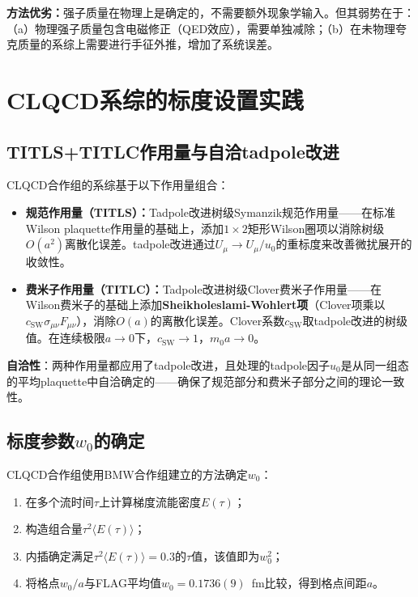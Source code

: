 \documentclass[12pt,a4paper]{ctexart}
\theoremstyle{definition}
\begin{document}
\textbf{方法优劣：}强子质量在物理上是确定的，不需要额外现象学输入。但其弱势在于：（a）物理强子质量包含电磁修正（QED效应），需要单独减除；（b）在未物理夸克质量的系综上需要进行手征外推，增加了系统误差。

\section{CLQCD系综的标度设置实践}

\subsection{TITLS+TITLC作用量与自洽tadpole改进}

CLQCD合作组的系综\cite{CLQCD2025quark_mass,CLQCD2024charm}基于以下作用量组合：

\begin{itemize}
    \item \textbf{规范作用量（TITLS）：}Tadpole改进树级Symanzik规范作用量——在标准Wilson plaquette作用量的基础上，添加$1\times2$矩形Wilson圈项以消除树级$O(a^2)$离散化误差。tadpole改进通过$U_\mu \to U_\mu/u_0$的重标度来改善微扰展开的收敛性。
    \item \textbf{费米子作用量（TITLC）：}Tadpole改进树级Clover费米子作用量——在Wilson费米子的基础上添加\textbf{Sheikholeslami-Wohlert项}（Clover项乘以$c_{\text{SW}} \sigma_{\mu\nu}F_{\mu\nu}$），消除$O(a)$的离散化误差。Clover系数$c_{\text{SW}}$取tadpole改进的树级值。在连续极限$a \to 0$下，$c_{\text{SW}} \to 1$，$m_0 a \to 0$。
\end{itemize}

\textbf{自洽性}：两种作用量都应用了tadpole改进，且处理的tadpole因子$u_0$是从同一组态的平均plaquette中自洽确定的——确保了规范部分和费米子部分之间的理论一致性。

\subsection{标度参数$w_0$的确定}

CLQCD合作组使用BMW合作组建立的方法\cite{CLQCD2024charm}确定$w_0$：

\begin{enumerate}
    \item 在多个流时间$\tau$上计算梯度流能密度$E(\tau)$；
    \item 构造组合量$\tau^2\langle E(\tau)\rangle$；
    \item 内插确定满足$\tau^2\langle E(\tau)\rangle = 0.3$的$\tau$值，该值即为$w^2_0$；
    \item 将格点$w_0/a$与FLAG平均值$w_0 = 0.1736(9)$~fm比较，得到格点间距$a$。
\end{enumerate}
\end{document}

